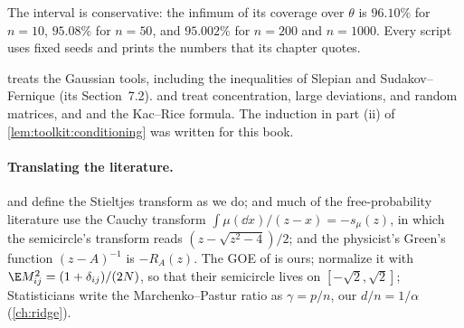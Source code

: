 \begin{refsection}
The interval is conservative: the infimum of its coverage over $\theta$ is $96.10\%$ for $n=10$, $95.08\%$ for $n=50$, and $95.002\%$ for $n=200$ and $n=1000$. Every script uses fixed seeds and prints the numbers that its chapter quotes.

\notesandrefs

\Textcite[Chapters~5 and~7]{Vershynin2018} treats the Gaussian tools, including the inequalities of Slepian and Sudakov--Fernique (its Section~7.2). \Textcite{BoucheronLugosiMassart2013} and \textcite{Ledoux2001} treat concentration, \textcite{DemboZeitouni2010} large deviations, \textcite{AndersonGuionnetZeitouni2010} and \textcite{BaiSilverstein2010} random matrices, and \textcite{AdlerTaylor2007} and \textcite{AzaisWschebor2009} the Kac--Rice formula. The induction in part (ii) of \cref{lem:toolkit:conditioning} was written for this book.

\paragraph{Translating the literature.} \Textcite{AndersonGuionnetZeitouni2010} and \textcite{BaiSilverstein2010} define the Stieltjes transform as we do; \textcite{BenArousMeiMontanariNica2019} and much of the free-probability literature use the Cauchy transform $\int\mu(\dd x)/(z-x)=-s_\mu(z)$, in which the semicircle's transform reads $(z-\sqrt{z^2-4})/2$; and the physicist's Green's function $(z-A)^{-1}$ is $-R_A(z)$. The GOE of \textcite{AndersonGuionnetZeitouni2010} is ours; \textcite{AuffingerBenArousCerny2013} normalize it with $\E M_{ij}^2=(1+\delta_{ij})/(2N)$, so that their semicircle lives on $[-\sqrt2,\sqrt2]$; Statisticians write the Marchenko--Pastur ratio as $\gamma=p/n$, our $d/n=1/\alpha$ (\cref{ch:ridge}).

\printchapterbib
\end{refsection}
